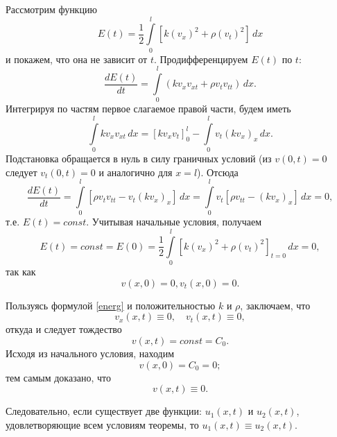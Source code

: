 Рассмотрим функцию 
\begin{equation}
	E(t) = \frac{1}{2} \int \limits_{0}^{l} [k(v_x)^2 + \rho(v_t)^2] \, dx
\end{equation}
и покажем, что она не зависит от $t$. Продифференцируем $E(t)$ по $t$:
\begin{equation*}
	\frac{d E(t)}{dt} = \int \limits_{0}^{l} (k v_x v_{xt} + \rho v_t v_{tt}) \, dx.
\end{equation*}
Интегрируя по частям первое слагаемое правой части, будем иметь
\begin{equation} \label{firstint}
	\int \limits_{0}^{l} k v_x v_{xt} \, dx = [k v_x v_t]_{0}^{l} - \int \limits_{0}^{l} v_t (k v_x)_x \, dx.
\end{equation}
Подстановка обращается в нуль в силу граничных условий (из $v(0, t) = 0$ следует $v_t(0, t) = 0$ и аналогично для $x = l$). Отсюда
\begin{equation*}
	\frac{d E(t)}{dt} = \int \limits_{0}^{l} [\rho v_t v_{tt} - v_t (k v_x)_x] \, dx = \int \limits_{0}^{l} v_{t} [\rho v_{tt} - (k v_{x})_x] \, dx = 0,
\end{equation*}
т.е. $E(t) = const$. Учитывая начальные условия, получаем
\begin{equation} \label{energ}
	E(t) = const = E(0) = \frac{1}{2} \int \limits_{0}^{l} [k(v_x)^2 + \rho (v_t)^2]_{t = 0} \, dx = 0,
\end{equation}
так как 
\begin{equation*}
	v(x, 0) = 0, v_t(x, 0) = 0.
\end{equation*}

Пользуясь формулой \eqref{energ} и положительностью $k$ и $\rho$, заключаем, что 
\begin{equation*}
	v_x(x, t) \equiv 0, \quad v_t(x, t) \equiv 0,
\end{equation*}
откуда и следует тождество
\begin{equation}
	v(x, t) = const = C_0.
\end{equation}
Исходя из начального условия, находим
\begin{equation*}
	v(x, 0) = C_0 = 0;
\end{equation*}
тем самым доказано, что 
\begin{equation}
	v(x, t) \equiv 0.
\end{equation}

Следовательно, если существует две функции: $u_1(x, t)$ и $u_2(x, t)$, удовлетворяющие всем условиям теоремы, то $u_1(x, t) \equiv u_2(x, t)$.

